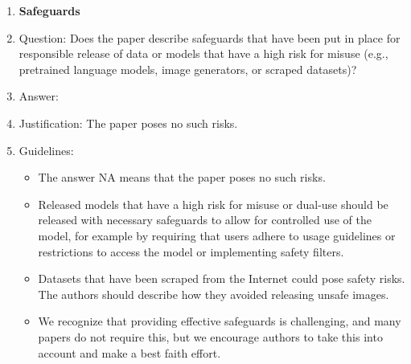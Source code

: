 \documentclass{article}
\theoremstyle{definition}
\begin{document}
\begin{enumerate}
\item {\bf Safeguards}
    \item[] Question: Does the paper describe safeguards that have been put in place for responsible release of data or models that have a high risk for misuse (e.g., pretrained language models, image generators, or scraped datasets)?
    \item[] Answer: \answerNA{} %
    \item[] Justification: The paper poses no such risks.
    \item[] Guidelines:
    \begin{itemize}
        \item The answer NA means that the paper poses no such risks.
        \item Released models that have a high risk for misuse or dual-use should be released with necessary safeguards to allow for controlled use of the model, for example by requiring that users adhere to usage guidelines or restrictions to access the model or implementing safety filters. 
        \item Datasets that have been scraped from the Internet could pose safety risks. The authors should describe how they avoided releasing unsafe images.
        \item We recognize that providing effective safeguards is challenging, and many papers do not require this, but we encourage authors to take this into account and make a best faith effort.
    \end{itemize}


\end{enumerate}
\end{document}
